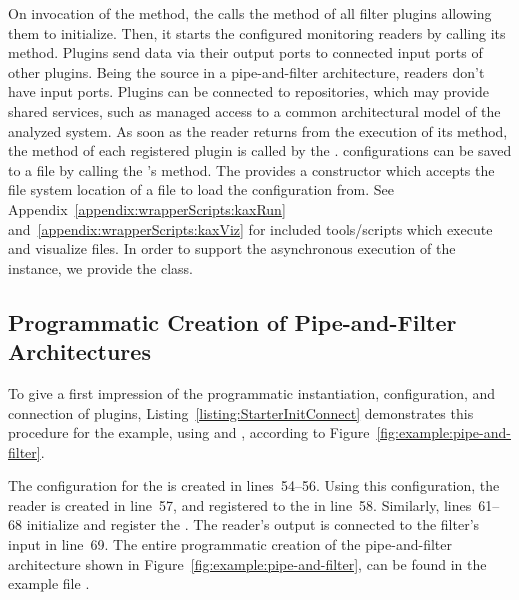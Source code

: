 \noindent On invocation of the  method, the  %
calls the  method of all filter plugins allowing them to initialize. %
Then, it starts the configured monitoring readers by calling its  %
method. Plugins send data via their output ports to connected input ports of other 
plugins. Being the source in a pipe-and-filter architecture, readers don't have %
input ports. Plugins can be connected to repositories, which may provide %
shared services, such as managed access to a common architectural model %
of the analyzed system. As soon as the reader returns from the execution of its  
method, the method  of each registered plugin is called by the %
. \KiekerAnalysisPart{} configurations can be saved %
to a  file by calling the 's  method. %
The  provides a constructor which accepts the %
file system location of a  file to load the configuration from. %
See Appendix~\ref{appendix:wrapperScripts:kaxRun} and~\ref{appendix:wrapperScripts:kaxViz} %
for included tools/scripts which execute and visualize  files.
In order to support the asynchronous execution of the  instance, %
we provide the  class.

\subsection{Programmatic Creation of Pipe-and-Filter Architectures}\label{sec:analysis:programmaticCreation}

To give a first impression of the programmatic %
instantiation, configuration, and connection of plugins, Listing~\ref{listing:StarterInitConnect} %
demonstrates this procedure for the example, using  and %
, according to Figure~\ref{fig:example:pipe-and-filter}.

The configuration for the  is created in lines~54--56. %
Using this configuration, the reader is created in line~57, and registered to %
the  in line~58. Similarly, lines~61--68 initialize %
and register the . The reader's output is connected %
to the filter's input in line~69. %
The entire programmatic creation of the pipe-and-filter architecture shown %
in Figure~\ref{fig:example:pipe-and-filter}, can be found in the example  %
file .


